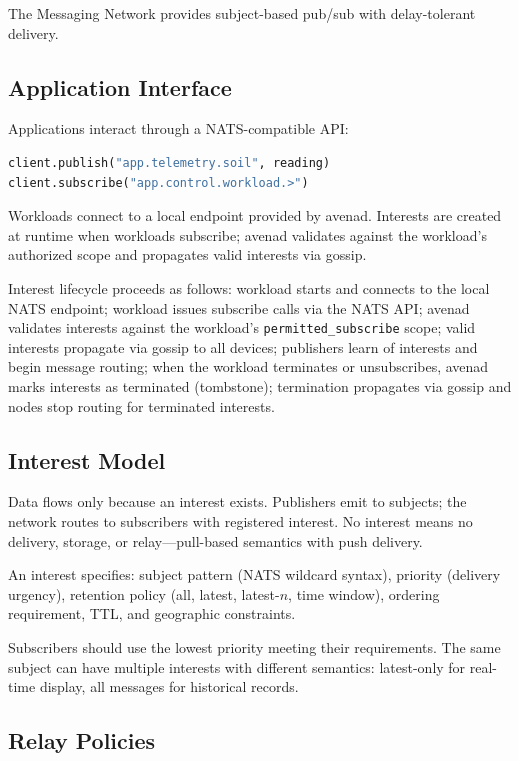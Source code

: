 \documentclass[journal]{IEEEtran}
\begin{document}
The Messaging Network provides subject-based pub/sub with delay-tolerant delivery.

\subsection{Application Interface}

Applications interact through a NATS-compatible API:

\begin{lstlisting}[language=Python]
client.publish("app.telemetry.soil", reading)
client.subscribe("app.control.workload.>")
\end{lstlisting}

Workloads connect to a local endpoint provided by avenad. Interests are created at runtime when workloads subscribe; avenad validates against the workload's authorized scope and propagates valid interests via gossip.

Interest lifecycle proceeds as follows: workload starts and connects to the local NATS endpoint; workload issues subscribe calls via the NATS API; avenad validates interests against the workload's \texttt{permitted\_subscribe} scope; valid interests propagate via gossip to all devices; publishers learn of interests and begin message routing; when the workload terminates or unsubscribes, avenad marks interests as terminated (tombstone); termination propagates via gossip and nodes stop routing for terminated interests.

\subsection{Interest Model}

Data flows only because an interest exists. Publishers emit to subjects; the network routes to subscribers with registered interest. No interest means no delivery, storage, or relay---pull-based semantics with push delivery.

An interest specifies: subject pattern (NATS wildcard syntax), priority (delivery urgency), retention policy (all, latest, latest-$n$, time window), ordering requirement, TTL, and geographic constraints.

Subscribers should use the lowest priority meeting their requirements. The same subject can have multiple interests with different semantics: latest-only for real-time display, all messages for historical records.

\subsection{Relay Policies}
\end{document}
